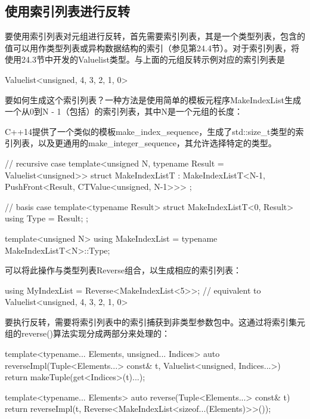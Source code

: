 \subsection{使用索引列表进行反转}

要使用索引列表对元组进行反转，首先需要索引列表，其是一个类型列表，包含的值可以用作类型列表或异构数据结构的索引（参见第24.4节）。对于索引列表，将使用24.3节中开发的Valuelist类型。与上面的元组反转示例对应的索引列表是

\begin{cpp}
Valuelist<unsigned, 4, 3, 2, 1, 0>
\end{cpp}

要如何生成这个索引列表？一种方法是使用简单的模板元程序MakeIndexList生成一个从0到N - 1（包括）的索引列表，其中N是一个元组的长度：

\begin{notice}
C++14提供了一个类似的模板make\_index\_sequence，生成了std::size\_t类型的索引列表，以及更通用的make\_integer\_sequence，其允许选择特定的类型。
\end{notice}

\begin{cpp}
// recursive case
template<unsigned N, typename Result = Valuelist<unsigned>>
struct MakeIndexListT
: MakeIndexListT<N-1, PushFront<Result, CTValue<unsigned, N-1>>> {};

// basis case
template<typename Result>
struct MakeIndexListT<0, Result> {
	using Type = Result;
};

template<unsigned N>
using MakeIndexList = typename MakeIndexListT<N>::Type;
\end{cpp}

可以将此操作与类型列表Reverse组合，以生成相应的索引列表：

\begin{cpp}
using MyIndexList = Reverse<MakeIndexList<5>>;
					// equivalent to Valuelist<unsigned, 4, 3, 2, 1, 0>
\end{cpp}

要执行反转，需要将索引列表中的索引捕获到非类型参数包中。这通过将索引集元组的reverse()算法实现分成两部分来处理的：

\begin{cpp}
template<typename... Elements, unsigned... Indices>
auto reverseImpl(Tuple<Elements...> const& t,
Valuelist<unsigned, Indices...>) {
	return makeTuple(get<Indices>(t)...);
}

template<typename... Elements>
auto reverse(Tuple<Elements...> const& t) {
	return reverseImpl(t,
	Reverse<MakeIndexList<sizeof...(Elements)>>());
}
\end{cpp}

